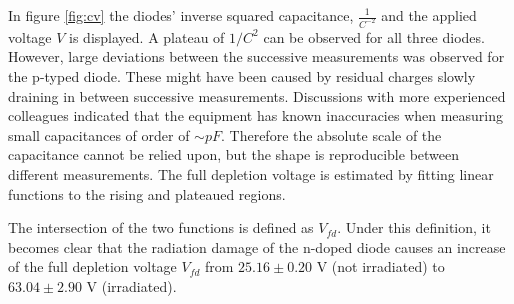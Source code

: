 \documentclass[11pt]{report}
\begin{document}
In figure \ref{fig:cv} the diodes' inverse squared capacitance, $\frac{1}{C^{-2}}$ and the applied voltage $V$ is displayed.
A plateau of $1/C^2$ can be observed for all three diodes.
However, large deviations between the successive measurements was observed for the p-typed diode. These might have been caused by residual charges slowly draining in between successive measurements.
Discussions with more experienced colleagues indicated that the equipment has known inaccuracies when measuring small capacitances of order of $\sim pF$. Therefore the absolute scale of the capacitance cannot be relied upon, but the shape is reproducible between different measurements.
The full depletion voltage is estimated by fitting linear functions to the rising and plateaued regions. 

The intersection of the two functions is defined as $V_{fd}$.
Under this definition, it becomes clear that the radiation damage of the n-doped diode causes an increase of the full depletion voltage $V_{fd}$ from $25.16\pm0.20$ V (not irradiated) to $63.04\pm2.90$ V (irradiated).

\end{document}
